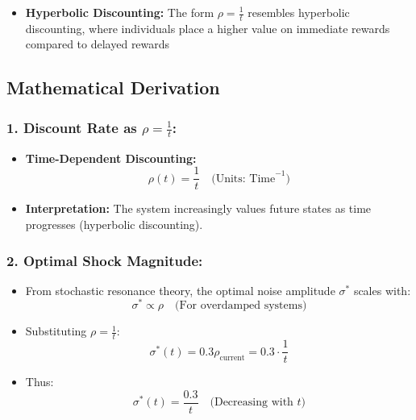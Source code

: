 \documentclass[10pt]{article}
\theoremstyle{definition}
\begin{document}
\begin{itemize}
    \item \textbf{Hyperbolic Discounting:} The form  $\rho = \frac{1}{t}$  resembles hyperbolic discounting, where individuals place a higher value on immediate rewards compared to delayed rewards
\end{itemize}

\subsection{Mathematical Derivation}

\subsubsection{1. Discount Rate as $\rho = \frac{1}{t}$:}

\begin{itemize}
    \item \textbf{Time-Dependent Discounting:}
        \begin{equation}
        \rho(t) = \frac{1}{t} \quad \text{(Units: Time}^{-1}\text{)}
        \end{equation}
    \item \textbf{Interpretation:} The system increasingly values future states as time progresses (hyperbolic discounting).
\end{itemize}

\subsubsection{2. Optimal Shock Magnitude:}

\begin{itemize}
    \item From stochastic resonance theory, the optimal noise amplitude $\sigma^*$ scales with:
        \begin{equation}
        \sigma^* \propto \rho \quad \text{(For overdamped systems)}
        \end{equation}
    \item Substituting $\rho = \frac{1}{t}$:
        \begin{equation}
        \sigma^*(t) = 0.3 \rho_{\text{current}} = 0.3 \cdot \frac{1}{t}
        \end{equation}
    \item Thus:
        \begin{equation}
        \sigma^*(t) = \frac{0.3}{t} \quad \text{(Decreasing with } t\text{)}
        \end{equation}
\end{itemize}
\end{document}
